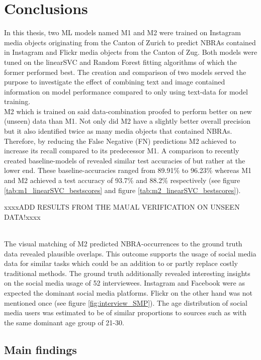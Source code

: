 \chapter{Conclusions} \label{conclusion_outlook}

In this thesis, two ML models named M1 and M2 were trained on Instagram media objects originating from the Canton of Zurich to predict NBRAs contained in Instagram and Flickr media objects from the Canton of Zug. Both models were tuned on the linearSVC and Random Forest fitting algorithms of which the former performed best. The creation and comparison of two models served the purpose to investigate the effect of combining text and image contained information on model performance compared to only using text-data for model training.\\
M2 which is trained on said data-combination proofed to perform better on new (unseen) data than M1. Not only did M2 have a slightly better overall precision but it also identified twice as many media objects that contained NBRAs. Therefore, by reducing the False Negative (FN) predictions M2 achieved to increase its recall compared to its predecessor M1. A comparison to recently created baseline-models of \parencite{Das2018, Li2018} revealed similar test accuracies of but rather at the lower end. These baseline-accuracies ranged from 89.91\% to 96.23\% whereas M1 and M2 achieved a test accuracy of 93.7\% and 88.2\% respectively (see figure \ref{tab:m1_linearSVC_bestscores} and figure \ref{tab:m2_linearSVC_bestscores}).

xxxxADD RESULTS FROM THE MAUAL VERIFICATION ON UNSEEN DATA!xxxx


\\
The visual matching of M2 predicted NBRA-occurrences to the ground truth data revealed plausible overlaps. This outcome supports the usage of social media data for similar tasks which could be an addition to or partly replace costly traditional methods. The ground truth additionally revealed interesting insights on the social media usage of 52 interviewees. Instagram and Facebook were as expected the dominant social media platforms. Flickr on the other hand was not mentioned once (see figure \ref{fig:interview_SMP}). The age distribution of social media users was estimated to be of similar proportions to sources such as \parencite{2013} with the same dominant age group of 21-30.

\section{Main findings}

